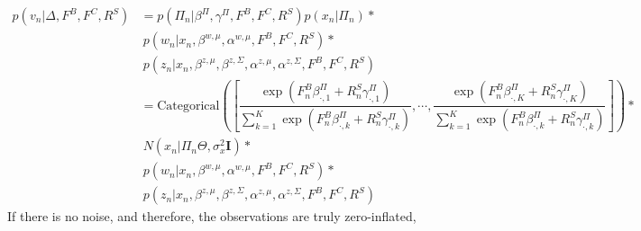 \documentclass[a4paper]{article}
\begin{document}
\begin{align*}
    p(v_n| \Delta, F^B, F^C, R^S) &= p(\Pi_n|\beta^\Pi, \gamma^\Pi,F^B, F^C, R^S)p(x_n|\Pi_n)*\\
                                  &~ p(w_n|x_n, \beta^{w, \mu}, \alpha^{w,\mu}, F^B, F^C, R^S)*\\
                                  &~ p(z_n|x_n, \beta^{z, \mu}, \beta^{z, \Sigma}, \alpha^{z,\mu}, \alpha^{z,\Sigma}, F^B, F^C, R^S)\\
                                  &= \text{Categorical}([\dfrac{\exp(F^B_n\beta^\Pi_{\cdot, 1} + R^S_n\gamma^\Pi_{\cdot, 1})}{\sum_{k=1}^{K}\exp(F^B_n\beta^\Pi_{\cdot, k} + R^S_n\gamma^\Pi_{\cdot, k})}, \cdots, \dfrac{\exp(F^B_n\beta^\Pi_{\cdot, K} + R^S_n\gamma^\Pi_{\cdot, K})}{\sum_{k=1}^{K}\exp(F^B_n\beta^\Pi_{\cdot, k} + R^S_n\gamma^\Pi_{\cdot, k})}]) * \\
                                  &~ N(x_n|\Pi_n\Theta, \sigma^2_x\mathbf{I})*\\
                                  &~ p(w_n|x_n, \beta^{w, \mu}, \alpha^{w,\mu}, F^B, F^C, R^S)*\\
                                  &~ p(z_n|x_n, \beta^{z, \mu}, \beta^{z, \Sigma}, \alpha^{z,\mu}, \alpha^{z,\Sigma}, F^B, F^C, R^S)
\end{align*}
If there is no noise, and therefore, the observations are truly zero-inflated, 
\end{document}
